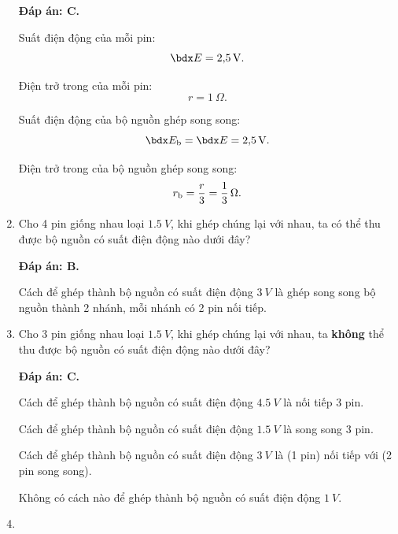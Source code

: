 \begin{enumerate}[label=\bfseries Câu \arabic*:]
{	}
	\loigiai
	{	\textbf{Đáp án: C.}
		
		Suất điện động của mỗi pin:
		$$\calE = \SI{2.5}{V}.$$
		
		Điện trở trong của mỗi pin:
		$$r=\SI{1}{\Omega}.$$
		
		Suất điện động của bộ nguồn ghép song song:
		$$\calE_\text b = \calE = \SI{2.5}{V}.$$
		
		Điện trở trong của bộ nguồn ghép song song:
		$$r_\text{b} = \dfrac{r}{3} = \xsi{\dfrac{1}{3}}{\Omega}.$$
	}
	\item {}
	
	\cauhoi
	{Cho 4 pin giống nhau loại $\SI{1.5}{V}$, khi ghép chúng lại với nhau, ta có thể thu được bộ nguồn có suất điện động nào dưới đây?
		
	}
	\loigiai
	{	\textbf{Đáp án: B.}
		
		Cách để ghép thành bộ nguồn có suất điện động $\SI{3}{V}$ là ghép song song bộ nguồn thành 2 nhánh, mỗi nhánh có 2 pin nối tiếp.
	}
	\item {}
	
	\cauhoi
	{Cho 3 pin giống nhau loại $\SI{1.5}{V}$, khi ghép chúng lại với nhau, ta \textbf{không} thể thu được bộ nguồn có suất điện động nào dưới đây?
		
	}
	\loigiai
	{	\textbf{Đáp án: C.}
		
		Cách để ghép thành bộ nguồn có suất điện động $\SI{4.5}{V}$ là nối tiếp 3 pin.
		
		Cách để ghép thành bộ nguồn có suất điện động $\SI{1.5}{V}$ là song song 3 pin.
		
		Cách để ghép thành bộ nguồn có suất điện động $\SI{3}{V}$ là (1 pin) nối tiếp với (2 pin song song).
		
		Không có cách nào để ghép thành bộ nguồn có suất điện động $\SI{1}{V}$.
	}
	\item {}
	

\end{enumerate}
